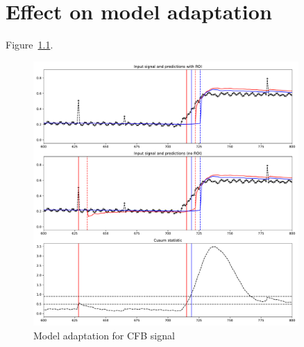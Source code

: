 \chapter{Effect on model adaptation}

Figure~\ref{fig:cfb_proof_of_concept}.
\begin{figure}[htb!]
	\centering
	\includegraphics[width=0.9\textwidth]{images/proof_of_concept_cfb}
  \caption{Model adaptation for CFB signal
	}\label{fig:cfb_proof_of_concept}
\end{figure}

